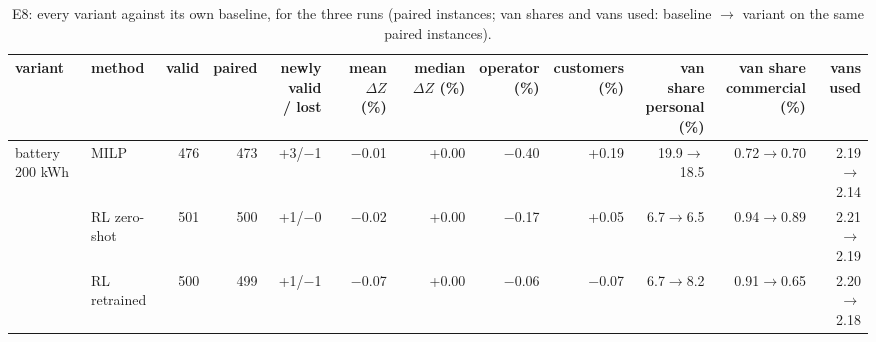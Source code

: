 \begin{table}[H]\centering
\scriptsize
\caption{E8: every variant against its own baseline, for the three runs (paired instances; van shares and vans used: baseline $\to$ variant on the same paired instances).}\label{tab:expE8}
\begin{adjustbox}{max width=\textwidth}\begin{tabular}{llrrrrrrrrrr}\toprule
variant & method & valid & paired & \shortstack{newly valid\\/ lost} & \shortstack{mean\\$\Delta Z$ (\%)} & \shortstack{median\\$\Delta Z$ (\%)} & \shortstack{operator\\(\%)} & \shortstack{customers\\(\%)} & \shortstack{van share\\personal (\%)} & \shortstack{van share\\commercial (\%)} & vans used \\ \midrule
battery 200 kWh & MILP & 476 & 473 & +3/$-$1 & $-$0.01 & +0.00 & $-$0.40 & +0.19 & 19.9$\to$18.5 & 0.72$\to$0.70 & 2.19$\to$2.14 \\
 & RL zero-shot & 501 & 500 & +1/$-$0 & $-$0.02 & +0.00 & $-$0.17 & +0.05 & 6.7$\to$6.5 & 0.94$\to$0.89 & 2.21$\to$2.19 \\
 & RL retrained & 500 & 499 & +1/$-$1 & $-$0.07 & +0.00 & $-$0.06 & $-$0.07 & 6.7$\to$8.2 & 0.91$\to$0.65 & 2.20$\to$2.18 \\
\bottomrule\end{tabular}\end{adjustbox}\end{table}
